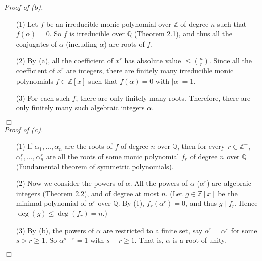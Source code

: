 \documentclass{article}
\begin{document}
\emph{Proof of (b).}
\begin{enumerate}
\item[(1)]
Let $f$ be an irreducible monic polynomial over $\mathbb{Z}$ of degree $n$
such that $f(\alpha) = 0$.
So $f$ is irreducible over $\mathbb{Q}$ (Theorem 2.1),
and thus all the conjugates of $\alpha$ (including $\alpha$) are roots of $f$.
\item[(2)]
By (a), all the coefficient of $x^r$ has absolute value $\leq {n \choose r}$.
Since all the coefficient of $x^r$ are integers,
there are finitely many irreducible monic polynomials $f \in \mathbb{Z}[x]$
such that $f(\alpha) = 0$ with $|\alpha| = 1$.
\item[(3)]
For each such $f$, there are only finitely many roots.
Therefore, there are only finitely many such algebraic integers $\alpha$.
\end{enumerate}
$\Box$ \\



\emph{Proof of (c).}
\begin{enumerate}
\item[(1)]
If $\alpha_1, \ldots, \alpha_n$
are the roots of $f$ of degree $n$ over $\mathbb{Q}$,
then for every $r \in \mathbb{Z}^+$,
$\alpha_1^r, \ldots, \alpha_n^r$
are all the roots of some monic polynomial $f_r$ of degree $n$ over $\mathbb{Q}$
(Fundamental theorem of symmetric polynomials).
\item[(2)]
Now we consider the powers of $\alpha$.
All the powers of $\alpha$ ($\alpha^r$) are algebraic integers (Theorem 2.2), and of
degree at most $n$.
(Let $g \in \mathbb{Z}[x]$ be the minimal polynomial of $\alpha^r$ over $\mathbb{Q}$.
By (1), $f_r(\alpha^r) = 0$, and thus $g \mid f_r$.
Hence $\deg(g) \leq \deg(f_r) = n$.)
\item[(3)]
By (b), the powers of $\alpha$ are restricted to a finite set,
say $\alpha^r = \alpha^s$ for some $s > r \geq 1$.
So $\alpha^{s-r} = 1$ with $s-r \geq 1$.
That is, $\alpha$ is a root of unity.
\end{enumerate}
$\Box$ \\\\



\end{document}

